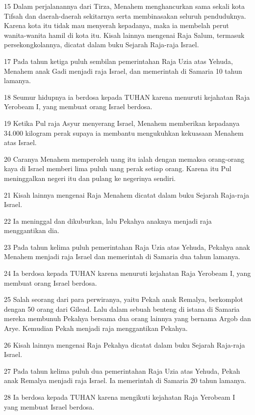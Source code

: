 \par 15 Dalam perjalanannya dari Tirza, Menahem menghancurkan sama sekali kota Tifsah dan daerah-daerah sekitarnya serta membinasakan seluruh penduduknya. Karena kota itu tidak mau menyerah kepadanya, maka ia membelah perut wanita-wanita hamil di kota itu. Kisah lainnya mengenai Raja Salum, termasuk persekongkolannya, dicatat dalam buku Sejarah Raja-raja Israel.
\par 17 Pada tahun ketiga puluh sembilan pemerintahan Raja Uzia atas Yehuda, Menahem anak Gadi menjadi raja Israel, dan memerintah di Samaria 10 tahun lamanya.
\par 18 Seumur hidupnya ia berdosa kepada TUHAN karena menuruti kejahatan Raja Yerobeam I, yang membuat orang Israel berdosa.
\par 19 Ketika Pul raja Asyur menyerang Israel, Menahem memberikan kepadanya 34.000 kilogram perak supaya ia membantu mengukuhkan kekuasaan Menahem atas Israel.
\par 20 Caranya Menahem memperoleh uang itu ialah dengan memaksa orang-orang kaya di Israel memberi lima puluh uang perak setiap orang. Karena itu Pul meninggalkan negeri itu dan pulang ke negerinya sendiri.
\par 21 Kisah lainnya mengenai Raja Menahem dicatat dalam buku Sejarah Raja-raja Israel.
\par 22 Ia meninggal dan dikuburkan, lalu Pekahya anaknya menjadi raja menggantikan dia.
\par 23 Pada tahun kelima puluh pemerintahan Raja Uzia atas Yehuda, Pekahya anak Menahem menjadi raja Israel dan memerintah di Samaria dua tahun lamanya.
\par 24 Ia berdosa kepada TUHAN karena menuruti kejahatan Raja Yerobeam I, yang membuat orang Israel berdosa.
\par 25 Salah seorang dari para perwiranya, yaitu Pekah anak Remalya, berkomplot dengan 50 orang dari Gilead. Lalu dalam sebuah benteng di istana di Samaria mereka membunuh Pekahya bersama dua orang lainnya yang bernama Argob dan Arye. Kemudian Pekah menjadi raja menggantikan Pekahya.
\par 26 Kisah lainnya mengenai Raja Pekahya dicatat dalam buku Sejarah Raja-raja Israel.
\par 27 Pada tahun kelima puluh dua pemerintahan Raja Uzia atas Yehuda, Pekah anak Remalya menjadi raja Israel. Ia memerintah di Samaria 20 tahun lamanya.
\par 28 Ia berdosa kepada TUHAN karena mengikuti kejahatan Raja Yerobeam I yang membuat Israel berdosa.
